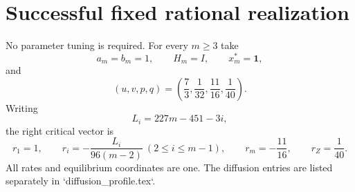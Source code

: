 \section*{Successful fixed rational realization}
No parameter tuning is required.  For every $m\ge3$ take
\[
a_m=b_m=1,
\qquad H_m=I,
\qquad x_m^*=\mathbf1,
\]
and
\[
(u,v,p,q)=\left(\frac73,\frac1{32},\frac{11}{16},\frac1{40}\right).
\]
Writing
\[
L_i=227m-451-3i,
\]
the right critical vector is
\[
r_1=1,
\qquad r_i=-\frac{L_i}{96(m-2)}\ (2\le i\le m-1),
\qquad r_m=-\frac{11}{16},
\qquad r_Z=\frac1{40}.
\]
All rates and equilibrium coordinates are one.  The diffusion entries are
listed separately in `diffusion_profile.tex`.
